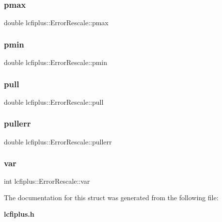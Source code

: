 \subsubsection{pmax}
{\footnotesize\ttfamily double lcfiplus\+::\+Error\+Rescale\+::pmax}

\mbox{\label{structlcfiplus_1_1ErrorRescale_aac813cb2fedcea439622c2490bcaba32}} 
\subsubsection{pmin}
{\footnotesize\ttfamily double lcfiplus\+::\+Error\+Rescale\+::pmin}

\mbox{\label{structlcfiplus_1_1ErrorRescale_a330ae724fc5d6330f1ff2849a28abd26}} 
\subsubsection{pull}
{\footnotesize\ttfamily double lcfiplus\+::\+Error\+Rescale\+::pull}

\mbox{\label{structlcfiplus_1_1ErrorRescale_a1b21869c63577092a2c84935c65b9c4a}} 
\subsubsection{pullerr}
{\footnotesize\ttfamily double lcfiplus\+::\+Error\+Rescale\+::pullerr}

\mbox{\label{structlcfiplus_1_1ErrorRescale_a75f1fa681083bae771778f1b3a39450c}} 
\subsubsection{var}
{\footnotesize\ttfamily int lcfiplus\+::\+Error\+Rescale\+::var}



The documentation for this struct was generated from the following file\+:\begin{DoxyCompactItemize}
\item 
\textbf{ lcfiplus.\+h}\end{DoxyCompactItemize}
